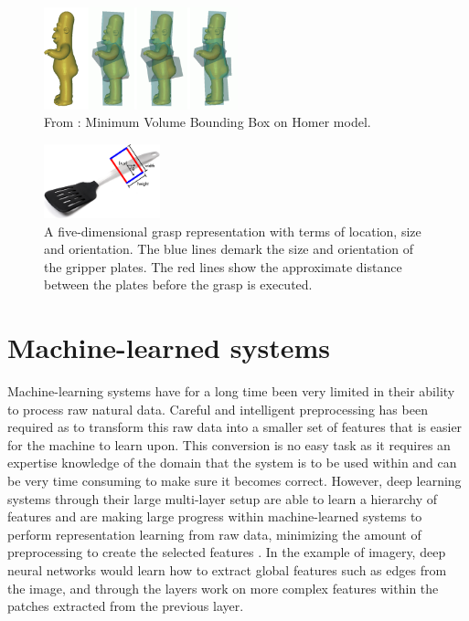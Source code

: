\begin{figure}
	\centering
	\includegraphics[width=0.5\textwidth]{img/related-work/mvbb.png}
	\caption{From \parencite{Huebner2008}: Minimum Volume Bounding Box on Homer model.}
	\label{fig:rel__mvbb}
\end{figure}

\begin{figure}
	\centering
	\includegraphics[width=0.3\textwidth]{img/related-work/grasp-representation.png}
	\caption{A five-dimensional grasp representation with terms of location, size and orientation. The blue lines demark the size and orientation of the gripper plates. The red lines show the approximate distance between the plates before the grasp is executed.}
	\label{fig:grasp-representation}
\end{figure}


\section{Machine-learned systems}
\label{sec:machine_learned_systems}
Machine-learning systems have for a long time been very limited in their ability to process raw natural data. Careful and intelligent preprocessing has been required as to transform this raw data into a smaller set of features that is easier for the machine to learn upon. This conversion is no easy task as it requires an expertise knowledge of the domain that the system is to be used within and can be very time consuming to make sure it becomes correct. However, deep learning systems through their large multi-layer setup are able to learn a hierarchy of features and are making large progress within machine-learned systems to perform representation learning from raw data, minimizing the amount of preprocessing to create the selected features \parencite{Lecun2015}. In the example of imagery, deep neural networks would learn how to extract global features such as edges from the image, and through the layers work on more complex features within the patches extracted from the previous layer.

